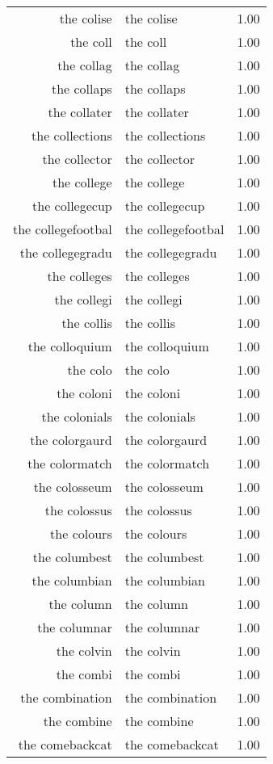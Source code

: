 \begin{table}[ht]
\begin{tabular}{rlr}
  the colise & the colise & 1.00 \\ 
  the coll & the coll & 1.00 \\ 
  the collag & the collag & 1.00 \\ 
  the collaps & the collaps & 1.00 \\ 
  the collater & the collater & 1.00 \\ 
  the collections & the collections & 1.00 \\ 
  the collector & the collector & 1.00 \\ 
  the college & the college & 1.00 \\ 
  the collegecup & the collegecup & 1.00 \\ 
  the collegefootbal & the collegefootbal & 1.00 \\ 
  the collegegradu & the collegegradu & 1.00 \\ 
  the colleges & the colleges & 1.00 \\ 
  the collegi & the collegi & 1.00 \\ 
  the collis & the collis & 1.00 \\ 
  the colloquium & the colloquium & 1.00 \\ 
  the colo & the colo & 1.00 \\ 
  the coloni & the coloni & 1.00 \\ 
  the colonials & the colonials & 1.00 \\ 
  the colorgaurd & the colorgaurd & 1.00 \\ 
  the colormatch & the colormatch & 1.00 \\ 
  the colosseum & the colosseum & 1.00 \\ 
  the colossus & the colossus & 1.00 \\ 
  the colours & the colours & 1.00 \\ 
  the columbest & the columbest & 1.00 \\ 
  the columbian & the columbian & 1.00 \\ 
  the column & the column & 1.00 \\ 
  the columnar & the columnar & 1.00 \\ 
  the colvin & the colvin & 1.00 \\ 
  the combi & the combi & 1.00 \\ 
  the combination & the combination & 1.00 \\ 
  the combine & the combine & 1.00 \\ 
  the comebackcat & the comebackcat & 1.00 \\ 

\end{tabular}
\end{table}
